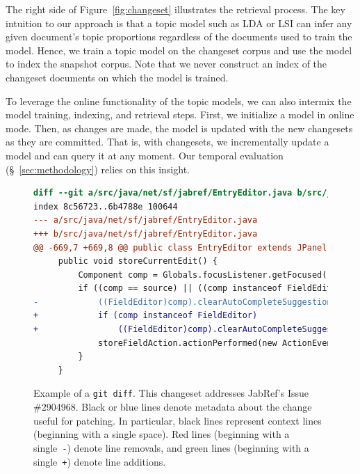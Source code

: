 The right side of Figure~\ref{fig:changeset} illustrates the retrieval process.
The key intuition to our approach is that a topic model such as LDA or LSI
can infer any given document's topic proportions regardless of the documents used to train the model.
Hence, we train a topic model on the changeset corpus and use the model to index the snapshot corpus.
Note that we never construct an index of the changeset documents on which the model is trained.

To leverage the online functionality of the topic models, we can also intermix the model training, indexing, and retrieval steps.
First, we initialize a model in online mode.
Then, as changes are made, the model is updated with the new changesets as they are committed.
That is, with changesets, we incrementally update a model and can query it at any moment.
Our temporal evaluation (\S~\ref{sec:methodology}) relies on this insight.



\begin{figure}[t]
\centering
\footnotesize
\begin{lstlisting}[language=diff, basicstyle=\ttfamily]
diff --git a/src/java/net/sf/jabref/EntryEditor.java b/src/java/net/sf/jabref/EntryEditor.java
index 8c56723..6b4788e 100644
--- a/src/java/net/sf/jabref/EntryEditor.java
+++ b/src/java/net/sf/jabref/EntryEditor.java
@@ -669,7 +669,8 @@ public class EntryEditor extends JPanel implements VetoableChangeListener {
     public void storeCurrentEdit() {
         Component comp = Globals.focusListener.getFocused();
         if ((comp == source) || ((comp instanceof FieldEditor) && this.isAncestorOf(comp))) {
-            ((FieldEditor)comp).clearAutoCompleteSuggestion();
+            if (comp instanceof FieldEditor)
+                ((FieldEditor)comp).clearAutoCompleteSuggestion();
             storeFieldAction.actionPerformed(new ActionEvent(comp, 0, ""));
         }
     }
\end{lstlisting}
\caption{Example of a \texttt{git diff}.
This changeset addresses JabRef's Issue \#2904968.
Black or blue lines denote metadata about the change useful for patching.
In particular, black lines represent context lines (beginning with a single space).
Red lines (beginning with a single~\texttt{-}) denote line removals,
and green lines (beginning with a single~\texttt{+}) denote line additions.}
\label{fig:diff}
\vspace{-10pt}
\end{figure}
